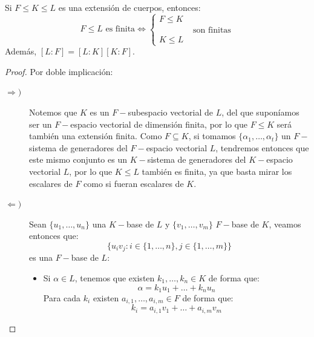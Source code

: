 \begin{lema}[de la Torre]
    Si $F\leq K \leq L$ es una extensión de cuerpos, entonces:
    \begin{equation*}
        F\leq L \text{\ es finita} \Longleftrightarrow \left\{\begin{array}{l}
            F\leq K \\
            \qquad \qquad \text{son finitas} \\
            K \leq L 
        \end{array}\right.
    \end{equation*}
    Además, $[L:F] = [L:K][K:F]$.
    \begin{proof}
        Por doble implicación:
        \begin{description}
            \item [$\Longrightarrow )$] Notemos que $K$ es un $F-$subespacio vectorial de $L$, del que suponíamos ser un $F-$espacio vectorial de dimensión finita, por lo que $F\leq K$ será también una extensión finita. Como $F\subseteq K$, si tomamos $\{\alpha_1, \ldots, \alpha_t\}$ un $F-$sistema de generadores del $F-$espacio vectorial $L$, tendremos entonces que este mismo conjunto es un $K-$sistema de generadores del $K-$espacio vectorial $L$, por lo que $K\leq L$ también es finita, ya que basta mirar los escalares de $F$ como si fueran escalares de $K$.
            \item [$\Longleftarrow )$] Sean $\{u_1, \ldots, u_n\}$ una $K-$base de $L$ y $\{v_1, \ldots, v_m\}$ $F-$base de $K$, veamos entonces que:
                \begin{equation*}
                    \{u_i v_j : i \in \{1,\ldots,n\}, j\in \{1,\ldots,m\}\}
                \end{equation*}
                es una $F-$base de $L$:
                \begin{itemize}
                    \item Si $\alpha\in L$, tenemos que existen $k_1, \ldots, k_n\in K$ de forma que:
                        \begin{equation*}
                            \alpha = k_1u_1 + \ldots + k_nu_n
                        \end{equation*}
                        Para cada $k_i$ existen $a_{i,1}, \ldots, a_{i,m}\in F$ de forma que:
                        \begin{equation*}
                            k_i = a_{i,1}v_1 + \ldots + a_{i,m}v_m
                        \end{equation*}

\end{itemize}
\end{description}
\end{proof}
\end{lema}
